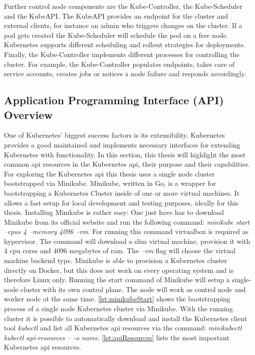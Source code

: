 \documentclass[titlepage]{report}
\begin{document}
Further control node components are the Kube-Controller, the Kube-Scheduler and the KubeAPI. The KubeAPI provides an  endpoint for the cluster and external clients, for instance an admin who triggers changes on the cluster.
If a pod gets created the Kube-Scheduler will schedule the pod on a free node. Kubernetes supports different scheduling and rollout strategies for deployments. Finally, the Kube-Controller implements different processes for controlling
the cluster. For example, the Kube-Controller populates endpoints, takes care of service accounts, creates jobs or notices a node failure and responds accordingly\cite{KubernetesComponents}.
\subsection{Application Programming Interface (API) Overview}
One of Kubernetes' biggest success factors is its extensibility. Kubernetes provides a good maintained  and implements necessary interfaces for extending Kubernetes with functionality. In this section, this thesis
will highlight the most common \gls{api} resources in the Kubernetes \gls{api}, their purpose and their capabilities. For exploring the Kubernetes \gls{api} this thesis uses a single node cluster bootstrapped via Minikube\cite{Minikube}.
Minikube, written in Go, is a wrapper for bootstrapping a Kubernetes Cluster inside of one or more virtual machines. It allows a fast setup for local development and testing purposes, ideally for this thesis. Installing Minikube is rather easy:
One just have has to download Minikube from its official website and run the following command: \emph{minikube start --cpus 4 --memory 4096 --vm}. For running this command virtualbox is required as hypervisor. The command will download a slim
virtual machine, provision it with 4 \gls{cpu} cores and 4096 megabytes of \gls{ram}. The \emph{--vm} flag will choose the virtual machine backend type. Minikube is able to provision a Kubernetes cluster directly on Docker, but this does not work
on every operating system and is therefore Linux only. Running the start command of Minikube will setup a single-node cluster with its own control plane. The node will work as control node and worker node at the same time. \autoref{lst:minikubeStart}
shows the bootstrapping process of a single node Kubernetes cluster via Minikube. With the running cluster it is possible to automatically download and install the Kubernetes client tool \emph{kubectl} and 
list all Kubernetes \gls{api} resources via the command: \emph{minikubectl kubectl api-resources -- -o name}. \autoref{lst:apiResources} lists the most important Kubernetes \gls{api} resources.
\end{document}
